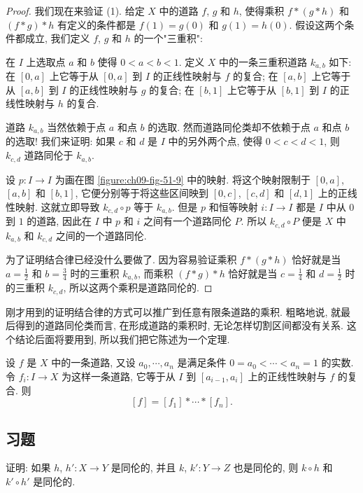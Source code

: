 \begin{proof}
我们现在来验证 (1). 给定 $X$ 中的道路 $f$, $g$ 和 $h$, 使得乘积 $f*(g*h)$ 和 $(f*g)*h$ 有定义的条件都是 $f(1)=g(0)$ 和 $g(1)=h(0)$. 假设这两个条件都成立, 我们定义 $f$, $g$ 和 $h$ 的一个"三重积":

在 $I$ 上选取点 $a$ 和 $b$ 使得 $0<a<b<1$. 定义 $X$ 中的一条三重积道路 $k_{a,b}$ 如下: 在 $[0,a]$ 上它等于从 $[0,a]$ 到 $I$ 的正线性映射与 $f$ 的复合; 在 $[a,b]$ 上它等于从 $[a,b]$ 到 $I$ 的正线性映射与 $g$ 的复合; 在 $[b,1]$ 上它等于从 $[b,1]$ 到 $I$ 的正线性映射与 $h$ 的复合.

道路 $k_{a,b}$ 当然依赖于点 $a$ 和点 $b$ 的选取. 然而道路同伦类却不依赖于点 $a$ 和点 $b$ 的选取! 我们来证明: 如果 $c$ 和 $d$ 是 $I$ 中的另外两个点, 使得 $0<c<d<1$, 则 $k_{c,d}$ 道路同伦于 $k_{a,b}$.

设 $p\colon I\to I$ 为画在图 \cref{figure:ch09-fig-51-9} 中的映射. 将这个映射限制于 $[0,a]$, $[a,b]$ 和 $[b,1]$, 它便分别等于将这些区间映到 $[0,c]$, $[c,d]$ 和 $[d,1]$ 上的正线性映射. 这就立即导致 $k_{c,d}\circ p$ 等于 $k_{a,b}$. 但是 $p$ 和恒等映射 $i\colon I\to I$ 都是 $I$ 中从 $0$ 到 $1$ 的道路, 因此在 $I$ 中 $p$ 和 $i$ 之间有一个道路同伦 $P$. 所以 $k_{c,d}\circ P$ 便是 $X$ 中 $k_{a,b}$ 和 $k_{c,d}$ 之间的一个道路同伦.


为了证明结合律已经没什么要做了. 因为容易验证乘积 $f*(g*h)$ 恰好就是当 $a=\frac{1}{2}$ 和 $b=\frac{3}{4}$ 时的三重积 $k_{a,b}$, 而乘积 $(f*g)*h$ 恰好就是当 $c=\frac{1}{4}$ 和 $d=\frac{1}{2}$ 时的三重积 $k_{c,d}$, 所以这两个乘积是道路同伦的.
\end{proof}

刚才用到的证明结合律的方式可以推广到任意有限条道路的乘积. 粗略地说, 就最后得到的道路同伦类而言, 在形成道路的乘积时, 无论怎样切割区间都没有关系. 这个结论后面将要用到, 所以我们把它陈述为一个定理.

\begin{theorem}
\label{theorem:ch09-sec51-51-3}
设 $f$ 是 $X$ 中的一条道路, 又设 $a_0,\cdots,a_n$ 是满足条件 $0=a_0<\cdots<a_n=1$ 的实数. 令 $f_i\colon I\to X$ 为这样一条道路, 它等于从 $I$ 到 $[a_{i-1},a_i]$ 上的正线性映射与 $f$ 的复合. 则
\[
[f]=[f_{1}]*\cdots*[f_{n}].
\]
\end{theorem}

\subsection*{习题}

\begin{exercise}
证明: 如果 $h$, $h'\colon X\to Y$ 是同伦的, 并且 $k$, $k'\colon Y\to Z$ 也是同伦的, 则 $k\circ h$ 和 $k'\circ h'$ 是同伦的.
\end{exercise}

